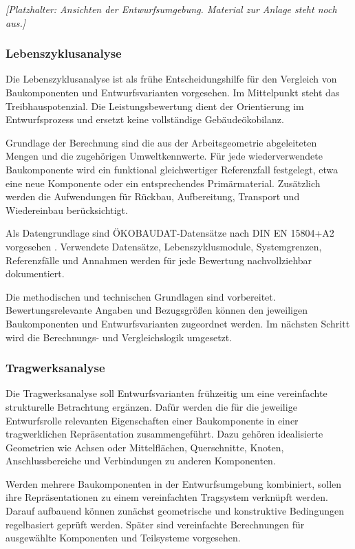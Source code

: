\documentclass[type=zwischenbericht]{zukunftbau}
\begin{document}
\begin{Figure}[title=Ansichten der Entwurfsumgebung]
\textit{[Platzhalter: Ansichten der Entwurfsumgebung. Material zur Anlage steht noch aus.]}
\end{Figure}

\subsubsection{Lebenszyklusanalyse}
Die Lebenszyklusanalyse ist als frühe Entscheidungshilfe für den Vergleich von Baukomponenten und Entwurfsvarianten vorgesehen. Im Mittelpunkt steht das Treibhauspotenzial. Die \Gls{Leistungsbewertung} dient der Orientierung im Entwurfsprozess und ersetzt keine vollständige Gebäudeökobilanz.

Grundlage der Berechnung sind die aus der Arbeitsgeometrie abgeleiteten Mengen und die zugehörigen Umweltkennwerte. Für jede wiederverwendete Baukomponente wird ein funktional gleichwertiger Referenzfall festgelegt, etwa eine neue Komponente oder ein entsprechendes Primärmaterial. Zusätzlich werden die Aufwendungen für Rückbau, Aufbereitung, Transport und Wiedereinbau berücksichtigt.

Als Datengrundlage sind ÖKOBAUDAT-Datensätze nach DIN EN 15804+A2 vorgesehen \cite{din-en-15804-umweltproduktdeklarationen-2022,bbsr-oekobaudat-handbuch-2023}. Verwendete Datensätze, Lebenszyklusmodule, Systemgrenzen, Referenzfälle und Annahmen werden für jede Bewertung nachvollziehbar dokumentiert.

Die methodischen und technischen Grundlagen sind vorbereitet. Bewertungsrelevante Angaben und Bezugsgrößen können den jeweiligen Baukomponenten und Entwurfsvarianten zugeordnet werden. Im nächsten Schritt wird die Berechnungs- und Vergleichslogik umgesetzt.

\subsubsection{Tragwerksanalyse}
Die Tragwerksanalyse soll Entwurfsvarianten frühzeitig um eine vereinfachte strukturelle Betrachtung ergänzen. Dafür werden die für die jeweilige Entwurfsrolle relevanten Eigenschaften einer Baukomponente in einer tragwerklichen Repräsentation zusammengeführt. Dazu gehören idealisierte Geometrien wie Achsen oder Mittelflächen, Querschnitte, Knoten, Anschlussbereiche und Verbindungen zu anderen Komponenten.

Werden mehrere Baukomponenten in der Entwurfsumgebung kombiniert, sollen ihre Repräsentationen zu einem vereinfachten Tragsystem verknüpft werden. Darauf aufbauend können zunächst geometrische und konstruktive Bedingungen regelbasiert geprüft werden. Später sind vereinfachte Berechnungen für ausgewählte Komponenten und Teilsysteme vorgesehen.
\end{document}
